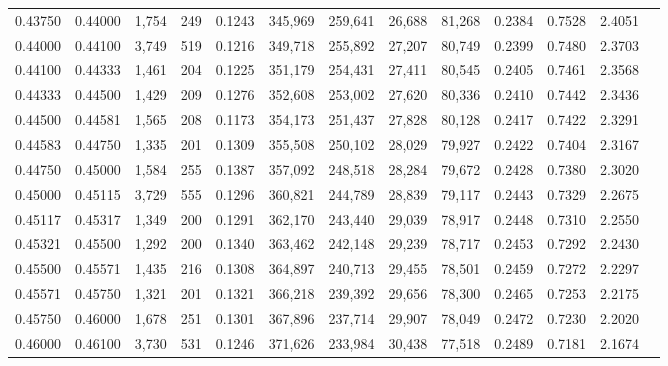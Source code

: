 \begin{tabular}{rrrrrrrrrrrrr}
0.43750 & 0.44000 & 1,754 & 249 &                                     0.1243 & 345,969 & 259,641 &  26,688 &  81,268 & 0.2384 & 0.7528 & 2.4051 \\
0.44000 & 0.44100 & 3,749 & 519 &                                     0.1216 & 349,718 & 255,892 &  27,207 &  80,749 & 0.2399 & 0.7480 & 2.3703 \\
0.44100 & 0.44333 & 1,461 & 204 &                                     0.1225 & 351,179 & 254,431 &  27,411 &  80,545 & 0.2405 & 0.7461 & 2.3568 \\
0.44333 & 0.44500 & 1,429 & 209 &                                     0.1276 & 352,608 & 253,002 &  27,620 &  80,336 & 0.2410 & 0.7442 & 2.3436 \\
0.44500 & 0.44581 & 1,565 & 208 &                                     0.1173 & 354,173 & 251,437 &  27,828 &  80,128 & 0.2417 & 0.7422 & 2.3291 \\
0.44583 & 0.44750 & 1,335 & 201 &                                     0.1309 & 355,508 & 250,102 &  28,029 &  79,927 & 0.2422 & 0.7404 & 2.3167 \\
0.44750 & 0.45000 & 1,584 & 255 &                                     0.1387 & 357,092 & 248,518 &  28,284 &  79,672 & 0.2428 & 0.7380 & 2.3020 \\
0.45000 & 0.45115 & 3,729 & 555 &                                     0.1296 & 360,821 & 244,789 &  28,839 &  79,117 & 0.2443 & 0.7329 & 2.2675 \\
0.45117 & 0.45317 & 1,349 & 200 &                                     0.1291 & 362,170 & 243,440 &  29,039 &  78,917 & 0.2448 & 0.7310 & 2.2550 \\
0.45321 & 0.45500 & 1,292 & 200 &                                     0.1340 & 363,462 & 242,148 &  29,239 &  78,717 & 0.2453 & 0.7292 & 2.2430 \\
0.45500 & 0.45571 & 1,435 & 216 &                                     0.1308 & 364,897 & 240,713 &  29,455 &  78,501 & 0.2459 & 0.7272 & 2.2297 \\
0.45571 & 0.45750 & 1,321 & 201 &                                     0.1321 & 366,218 & 239,392 &  29,656 &  78,300 & 0.2465 & 0.7253 & 2.2175 \\
0.45750 & 0.46000 & 1,678 & 251 &                                     0.1301 & 367,896 & 237,714 &  29,907 &  78,049 & 0.2472 & 0.7230 & 2.2020 \\
0.46000 & 0.46100 & 3,730 & 531 &                                     0.1246 & 371,626 & 233,984 &  30,438 &  77,518 & 0.2489 & 0.7181 & 2.1674 \\

\end{tabular}
